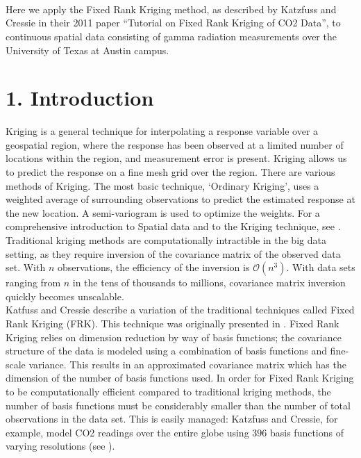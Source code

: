 \documentclass[11pt]{article}
\title{
\vspace{2in}
\textmd{\textbf{\hmwkTitle}}\\
\normalsize\vspace{0.1in}\small{\hmwkDueDate}\\
\vspace{0.1in}\large{\textit{\hmwkClassInstructor\ }}
\vspace{3in}
}
\author{\textbf{\hmwkAuthorName}}
\date{} %
\begin{document}
\maketitle



\newpage

Here we apply the Fixed Rank Kriging method, as described by Katzfuss and Cressie in their 2011 paper ``Tutorial on Fixed Rank Kriging of CO2 Data'', to continuous spatial data consisting of gamma radiation measurements over the University of Texas at Austin campus.  

\section{1. Introduction}

Kriging is a general technique for interpolating a response variable over a geospatial region, where the response has been observed at a limited number of locations within the region, and measurement error is present.  Kriging allows us to predict the response on a fine mesh grid over the region. There are various methods of Kriging.  The most basic technique, `Ordinary Kriging', uses a weighted average of surrounding observations to predict the estimated response at the new location.  A semi-variogram is used to optimize the weights. For a comprehensive introduction to Spatial data and to the Kriging technique, see \cite{Cressiebook}.  \\

Traditional kriging methods are computationally intractible in the big data setting, as they  require inversion of the covariance matrix of the observed data set.  With $n$ observations, the efficiency of the inversion is $\mathcal{O}(n^3)$. With data sets ranging from $n$ in the tens of thousands to millions, covariance matrix inversion quickly becomes unscalable. \\

Katfuss and Cressie describe a variation of the traditional techniques called Fixed Rank Kriging (FRK). This technique was originally presented in \cite{Cressie}.  Fixed Rank Kriging relies on dimension reduction by way of basis functions; the covariance structure of the data is modeled using a combination of basis functions and fine-scale variance.  This results in an approximated covariance matrix which has the dimension of the number of basis functions used.  In order for Fixed Rank Kriging to be computationally efficient compared to traditional kriging methods, the number of basis functions must be considerably smaller than the number of total observations in the data set.  This is easily managed: Katzfuss and Cressie, for example, model CO2 readings over the entire globe using $396$ basis functions of varying resolutions (see \cite{Katzfuss}).  \\
\end{document}
